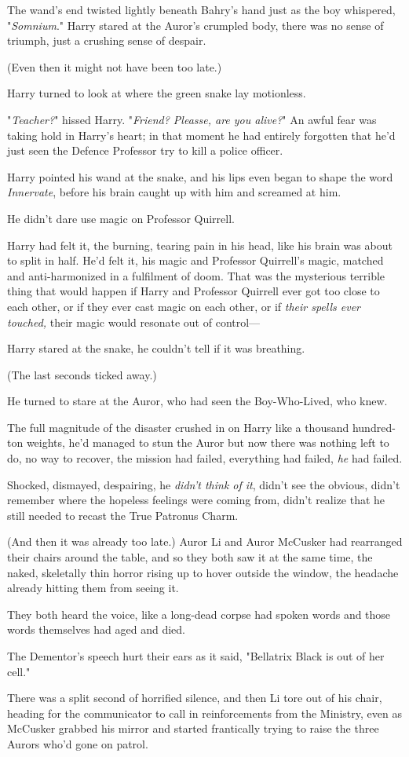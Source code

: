 The wand's end twisted lightly beneath Bahry's hand just as the boy whispered,
"\emph{Somnium}."
\later
Harry stared at the Auror's crumpled body, there was no sense of triumph, just
a crushing sense of despair.

(Even then it might not have been too late.)

Harry turned to look at where the green snake lay motionless.

"\emph{Teacher?}" hissed Harry. "\emph{Friend? Pleasse, are you alive?}" An
awful fear was taking hold in Harry's heart; in that moment he had entirely
forgotten that he'd just seen the Defence Professor try to kill a police
officer.

Harry pointed his wand at the snake, and his lips even began to shape the word
\emph{Innervate}, before his brain caught up with him and screamed at him.

He didn't dare use magic on Professor Quirrell.

Harry had felt it, the burning, tearing pain in his head, like his brain was
about to split in half. He'd felt it, his magic and Professor Quirrell's magic,
matched and anti-harmonized in a fulfilment of doom. That was the mysterious
terrible thing that would happen if Harry and Professor Quirrell ever got too
close to each other, or if they ever cast magic on each other, or if
\emph{their spells ever touched,} their magic would resonate out of control---

Harry stared at the snake, he couldn't tell if it was breathing.

(The last seconds ticked away.)

He turned to stare at the Auror, who had seen the Boy-Who-Lived, who knew.

The full magnitude of the disaster crushed in on Harry like a thousand
hundred-ton weights, he'd managed to stun the Auror but now there was nothing
left to do, no way to recover, the mission had failed, everything had failed,
\emph{he} had failed.

Shocked, dismayed, despairing, he \emph{didn't think of it}, didn't see the
obvious, didn't remember where the hopeless feelings were coming from, didn't
realize that he still needed to recast the True Patronus Charm.

(And then it was already too late.)
\later
Auror Li and Auror McCusker had rearranged their chairs around the table, and
so they both saw it at the same time, the naked, skeletally thin horror rising
up to hover outside the window, the headache already hitting them from seeing
it.

They both heard the voice, like a long-dead corpse had spoken words and those
words themselves had aged and died.

The Dementor's speech hurt their ears as it said, "Bellatrix Black is out of
her cell."

There was a split second of horrified silence, and then Li tore out of his
chair, heading for the communicator to call in reinforcements from the
Ministry, even as McCusker grabbed his mirror and started frantically trying to
raise the three Aurors who'd gone on patrol.
